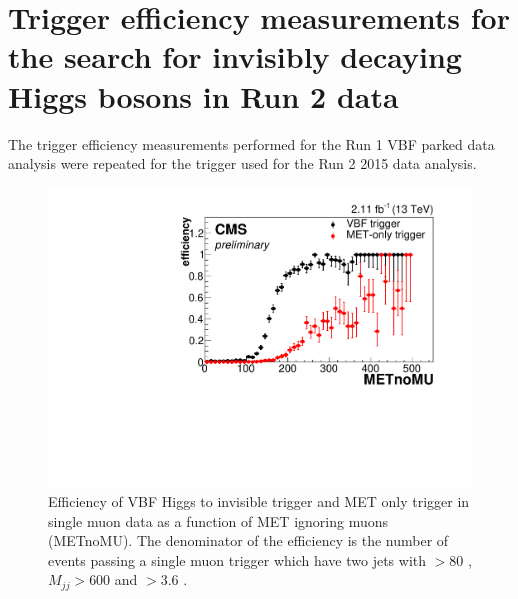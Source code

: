 \chapter{Trigger efficiency measurements for the search for invisibly decaying Higgs bosons in Run 2 data}
\label{chap:run2}

The trigger efficiency measurements performed for the Run 1 \ac{VBF} parked data analysis were repeated for the trigger used for the Run 2 2015 data analysis.

\begin{figure}
  \includegraphics[width=\largefigwidth]{plots/run2/output_2015Dtrigeff_131115json_sigtrig_031215/nunu_metnomuons.pdf}
  \caption{Efficiency of VBF Higgs to invisible trigger and MET only trigger in single muon data as a function of MET ignoring muons (METnoMU). The denominator of the efficiency is the number of events passing a single muon trigger which have two jets with \pt$> 80$ \GeV, $M_{jj}>600$ \GeV and \detajj$> 3.6$ \GeV.}
  \label{fig:run2meteff}
\end{figure}

